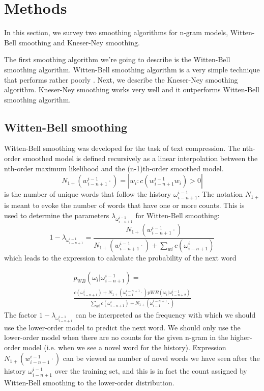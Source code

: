 \documentclass[10pt, a4paper]{article}
\begin{document}
\section{Methods}

In this section, we survey two smoothing algorithms for n-gram models, Witten-Bell smoothing and Kneser-Ney smoothing. 

The first smoothing algorithm we\rq{}re going to describe is the Witten-Bell smoothing algorithm. Witten-Bell smoothing algorithm is a very simple technique that performs rather poorly \cite{1_chen1999empirical}. Next, we describe the Kneser-Ney smoothing algorithm. Kneser-Ney smoothing works very well and it outperforms Witten-Bell smoothing algorithm.

\subsection{Witten-Bell smoothing}
Witten-Bell smoothing was developed for the task of text compression. The nth-order smoothed model is defined recursively as a linear interpolation between the nth-order maximum likelihood and the (n-1)th-order smoothed model. 
\begin{equation}
N_{1+}(w_{i-n+1}^{i-1}\cdot) = |{w_{i} : c(w_{i-n+1}^{i-1}w_{i}) > 0}|
\end{equation}
is the number of unique words that follow the history $ \omega_{i-n+1}^{i-1} $.
The notation $N_{1+}$ is meant to evoke the number of words that have one or more counts.
This is used to determine the parameters $ \lambda_{\omega_{i-n+1}^{i-1}} $  for Witten-Bell smoothing:
\begin{equation}
1-\lambda_{\omega_{i-n+1}^{i-1}}=\frac{N_{1+}(w_{i-n+1}^{i-1}\cdot)}{N_{1+}(w_{i-n+1}^{i-1}\cdot) + \sum_{wi}c(\omega_{i-n+1}^{i})}
\end{equation}
which leads to the expression to calculate the probability of the next word 

\begin{multline}
p_{WB}(\omega_i|\omega_{i-n+1}^{i-1})= \\ \frac{c(\omega_{i-n+1}^{i}) + N_{1+}(\omega_{i-1}^{i-n+1}\cdot)p{WB}(\omega_i|\omega_{i-n+2}^{i-1})}{\sum_{wi}c(\omega_{i-n+1}^{i}) + N_{1+}(\omega_{i-1}^{i-n+1}\cdot)}
\end{multline}
The factor $ 1-\lambda_{\omega_{i-n+1}^{i-1}} $ can be interpreted as the frequency with which we should use the lower-order model to predict the next word. We should only use the lower-order model when there are no counts for the given n-gram in the higher-order model (i.e. when we see a novel word for the history). Expression $ N_{1+}(w_{i-n+1}^{i-1}\cdot) $ can be viewed as number of novel words we have seen after the history $ \omega_{i-n+1}^{i-1} $ over the training set, and this is in fact the count assigned by Witten-Bell smoothing to the lower-order distribution.
\end{document}
